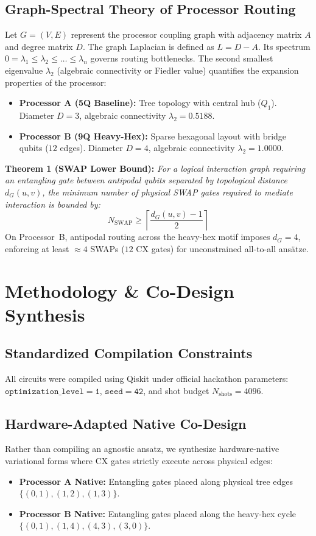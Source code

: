 \documentclass[journal,twocolumn]{article}
\begin{document}
\subsection{Graph-Spectral Theory of Processor Routing}
Let $G = (V, E)$ represent the processor coupling graph with adjacency matrix $A$ and degree matrix $D$. The graph Laplacian is defined as $L = D - A$. Its spectrum $0 = \lambda_1 \le \lambda_2 \le \dots \le \lambda_n$ governs routing bottlenecks. The second smallest eigenvalue $\lambda_2$ (algebraic connectivity or Fiedler value) quantifies the expansion properties of the processor:
\begin{itemize}
  \item \textbf{Processor A (5Q Baseline):} Tree topology with central hub ($Q_1$). Diameter $D = 3$, algebraic connectivity $\lambda_2 = 0.5188$.
  \item \textbf{Processor B (9Q Heavy-Hex):} Sparse hexagonal layout with bridge qubits ($12$ edges). Diameter $D = 4$, algebraic connectivity $\lambda_2 = 1.0000$.
\end{itemize}

\textbf{Theorem 1 (SWAP Lower Bound):} \textit{For a logical interaction graph requiring an entangling gate between antipodal qubits separated by topological distance $d_{G}(u, v)$, the minimum number of physical SWAP gates required to mediate interaction is bounded by:}
\begin{equation}
N_{\text{SWAP}} \ge \left\lceil \frac{d_G(u, v) - 1}{2} \right\rceil
\end{equation}
On Processor~B, antipodal routing across the heavy-hex motif imposes $d_G = 4$, enforcing at least $\approx 4$ SWAPs ($12$ CX gates) for unconstrained all-to-all ansätze.

\section{Methodology \& Co-Design Synthesis}

\subsection{Standardized Compilation Constraints}
All circuits were compiled using Qiskit under official hackathon parameters:
$\mathtt{optimization\_level=1}$, $\mathtt{seed=42}$, and shot budget $N_{\text{shots}}=4096$.

\subsection{Hardware-Adapted Native Co-Design}
Rather than compiling an agnostic ansatz, we synthesize hardware-native variational forms where CX gates strictly execute across physical edges:
\begin{itemize}
  \item \textbf{Processor A Native:} Entangling gates placed along physical tree edges $\{(0, 1), (1, 2), (1, 3)\}$.
  \item \textbf{Processor B Native:} Entangling gates placed along the heavy-hex cycle $\{(0, 1), (1, 4), (4, 3), (3, 0)\}$.
\end{itemize}
\end{document}
